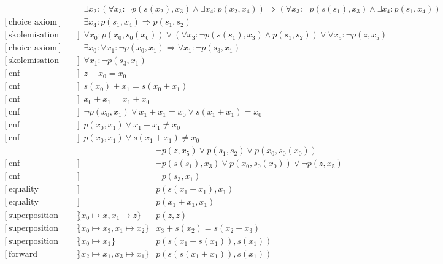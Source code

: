 \documentclass[onehalfspacing]{article}
\begin{document}
\begin{landscape}
\begin{align}
	[\text{choice axiom}] &&	 \exists x_2 : (\forall x_3 : \neg p(s(x_2),x_3) \wedge \exists x_4 : p(x_2,x_4)) \Rightarrow (\forall x_3 : \neg p(s(s_1),x_3) \wedge \exists x_4 : p(s_1,x_4)) \\
	[\text{choice axiom}] &&	 \exists x_4 : p(s_1,x_4) \Rightarrow p(s_1,s_2) \\
	[\text{skolemisation 13,16,15,14}] &&	 \forall x_0 : p(x_0,s_0(x_0)) \vee (\forall x_3 : \neg p(s(s_1),x_3) \wedge p(s_1,s_2)) \vee \forall x_5 : \neg p(z,x_5) \\
	[\text{choice axiom}] &&	 \exists x_0 : \forall x_1 : \neg p(x_0,x_1) \Rightarrow \forall x_1 : \neg p(s_3,x_1) \\
	[\text{skolemisation 9,17}] &&	 \forall x_1 : \neg p(s_3,x_1) \\
	[\text{cnf transformation 1}] &&	 z + x_0 = x_0 \\
	[\text{cnf transformation 2}] &&	 s(x_0) + x_1 = s(x_0 + x_1) \\
	[\text{cnf transformation 3}] &&	 x_0 + x_1 = x_1 + x_0 \\
	[\text{cnf transformation 11}] &&	 \neg p(x_0,x_1) \vee x_1 + x_1 = x_0 \vee s(x_1 + x_1) = x_0 \\
	[\text{cnf transformation 11}] &&	 p(x_0,x_1) \vee x_1 + x_1 \neq x_0 \\
	[\text{cnf transformation 11}] &&	 p(x_0,x_1) \vee s(x_1 + x_1) \neq x_0
\end{align}
\begin{align}
	[\text{cnf transformation 17}] &&	 \neg p(z,x_5) \vee p(s_1,s_2) \vee p(x_0,s_0(x_0)) \\
	[\text{cnf transformation 17}] &&	 \neg p(s(s_1),x_3) \vee p(x_0,s_0(x_0)) \vee \neg p(z,x_5) \\
	[\text{cnf transformation 19}] &&	 \neg p(s_3,x_1) \\
	[\text{equality resolution 25}] &&	 p(s(x_1 + x_1),x_1) \\
	[\text{equality resolution 24}] &&	 p(x_1 + x_1,x_1) \\
	[\text{superposition 30,20}] &\{x_0\mapsto x, x_1\mapsto z\}&	 p(z,z) \\
	[\text{superposition 21,22}] &\{x_0\mapsto x_3, x_1\mapsto x_2\}&	 x_3 + s(x_2) = s(x_2+x_3) \\
	[\text{superposition 30,21}] &\{x_0\mapsto x_1\}&	 p(s(x_1+s(x_1)),s(x_1)) \\
	[\text{forward demodulation 33,32}] &\{x_2\mapsto x_1, x_3\mapsto x_1\}&	 p(s(s(x_1 + x_1)),s(x_1)) \\

\end{align}
\end{landscape}
\end{document}
